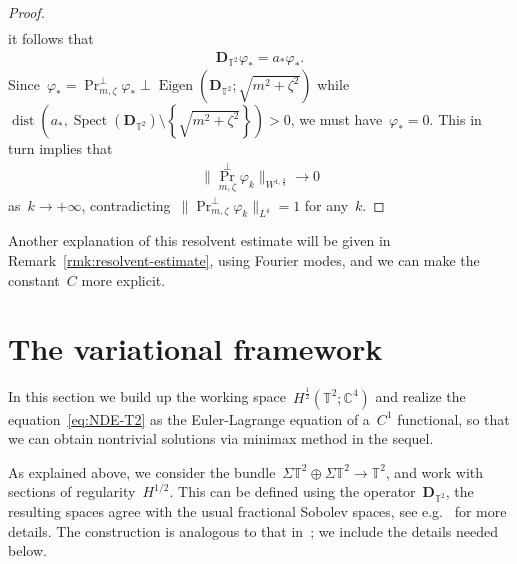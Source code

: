 \documentclass[11pt,final]{amsart}
\newcommand{\C}{\mathbb{C}}
\newcommand{\T}{\mathbb{T}}
\newcommand{\pD}{\mathbf{D}}
\newcommand{\braces}[1]{\left\{#1\right\}} %
\DeclareMathOperator{\dist}{dist}
\DeclareMathOperator{\Eigen}{Eigen}
\DeclareMathOperator{\proj}{Pr}
\DeclareMathOperator{\Spect}{Spect}
\begin{document}
\begin{proof}
\begin{align}
        \end{align}
        it follows that
        \begin{align}
            \pD_{\T^2}\varphi_*=a_*\varphi_*.
        \end{align}
        Since~$\varphi_* =\proj_{m,\zeta}^\perp\varphi_*\perp \Eigen(\pD_{\T^2};\sqrt{m^2+\zeta^2})$ while~$\dist(a_*, \Spect(\pD_{\T^2})\setminus\braces{\sqrt{m^2+\zeta^2}})>0$, we must have~$\varphi_*=0$.
        This in turn implies that
        \begin{align}
            \|\proj_{m,\zeta}^\perp \varphi_k\|_{W^{1,\frac{4}{3}}} \to 0
        \end{align}
        as~$k\to+\infty$, contradicting~$\|\proj_{m,\zeta}^\perp\varphi_k\|_{L^4}=1$ for any~$k$.
\end{proof}

Another explanation of this resolvent estimate will be given in Remark~\ref{rmk:resolvent-estimate}, using Fourier modes, and we can make the constant~$C$ more explicit. 



\section{The variational framework}\label{sect:variational framework}

In this section we build up the working space~$H^{\frac{1}{2}}(\T^2;\C^4)$ and realize the equation~\eqref{eq:NDE-T2} as the Euler-Lagrange equation of a~$C^1$ functional, so that we can obtain nontrivial solutions via minimax method in the sequel. 

As explained above, we consider the bundle~$\Sigma\T^2\oplus\Sigma\T^2\to\T^2$, and work with sections of regularity~$H^{1/2}$.  
This can be defined using the operator~$\pD_{\T^2}$, the resulting spaces agree with the usual fractional Sobolev spaces, see e.g.~\cite{Ammann2003Habil, SireXu2023variational} for more details. 
The construction is analogous to that in~\cite{WZ2026Stationary}; we include the details needed below.  
\end{document}
